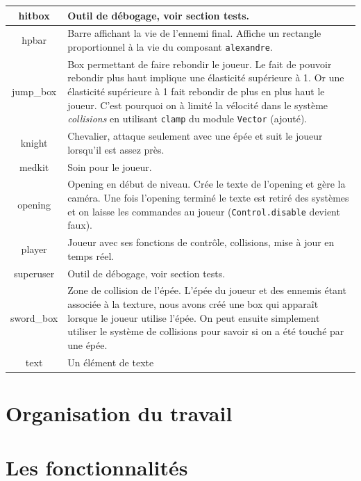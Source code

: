 \documentclass{article}
\begin{document}
\begin{center}
\begin{tabular}[h]{ |c|p{10cm}| }
        \hline
        hitbox & Outil de débogage, voir section tests. \\
        \hline
        hpbar & Barre affichant la vie de l'ennemi final. Affiche un rectangle proportionnel à la vie du composant \verb|alexandre|. \\
        \hline
        jump\_box & Box permettant de faire rebondir le joueur. Le fait de pouvoir rebondir plus haut implique une élasticité 
        supérieure à 1. Or une élasticité supérieure à 1 fait rebondir de plus en plus haut le joueur. C'est pourquoi on à limité la 
        vélocité dans le système \textit{collisions} en utilisant \verb|clamp| du module \verb|Vector| (ajouté). \\
        \hline
        knight & Chevalier, attaque seulement avec une épée et suit le joueur lorsqu'il est assez près. \\
        \hline
        medkit & Soin pour le joueur. \\
        \hline
        opening & Opening en début de niveau. Crée le texte de l'opening et gère la caméra. Une fois l'opening terminé 
        le texte est retiré des systèmes et on laisse les commandes au joueur (\verb|Control.disable| devient faux). \\
        \hline
        player & Joueur avec ses fonctions de contrôle, collisions, mise à jour en temps réel. \\
        \hline
        superuser & Outil de débogage, voir section tests. \\
        \hline
        sword\_box & Zone de collision de l'épée. L'épée du joueur et des ennemis étant associée à la texture, nous avons 
        créé une box qui apparaît lorsque le joueur utilise l'épée. On peut ensuite simplement utiliser le système de collisions 
        pour savoir si on a été touché par une épée. \\
        \hline
        text & Un élément de texte \\
        \hline

    \end{tabular}
\end{center}



\section{Organisation du travail}

\section{Les fonctionnalités}
\end{document}
